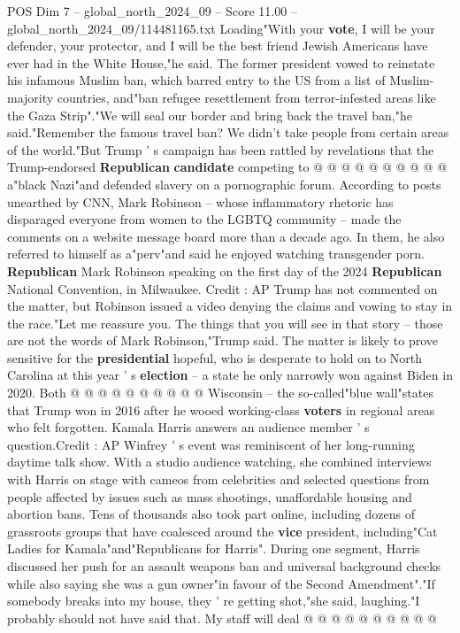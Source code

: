 \begin{textsample}{POS Dim 7 – global\_north\_2024\_09 – Score 11.00 – global\_north\_2024\_09/114481165.txt}
Loading"With your \textbf{vote}, I will be your defender, your protector, and I will be the best friend Jewish Americans have ever had in the White House,"he said.
The former president vowed to reinstate his infamous Muslim ban, which barred entry to the US from a list of Muslim-majority countries, and"ban refugee resettlement from terror-infested areas like the Gaza Strip"."We will seal our border and bring back the travel ban,"he said."Remember the famous travel ban?
We didn't take people from certain areas of the world."But Trump ' s campaign has been rattled by revelations that the Trump-endorsed \textbf{Republican} \textbf{candidate} competing to @ @ @ @ @ @ @ @ @ @ a"black Nazi"and defended slavery on a pornographic forum.
According to posts unearthed by CNN, Mark Robinson -- whose inflammatory rhetoric has disparaged everyone from women to the LGBTQ community -- made the comments on a website message board more than a decade ago.
In them, he also referred to himself as a"perv"and said he enjoyed watching transgender porn. \textbf{Republican} Mark Robinson speaking on the first day of the 2024 \textbf{Republican} National Convention, in Milwaukee.
Credit : AP Trump has not commented on the matter, but Robinson issued a video denying the claims and vowing to stay in the race."Let me reassure you.
The things that you will see in that story -- those are not the words of Mark Robinson,"Trump said.
The matter is likely to prove sensitive for the \textbf{presidential} hopeful, who is desperate to hold on to North Carolina at this year ' s \textbf{election} -- a state he only narrowly won against Biden in 2020.
Both @ @ @ @ @ @ @ @ @ @ Wisconsin -- the so-called"blue wall"states that Trump won in 2016 after he wooed working-class \textbf{voters} in regional areas who felt forgotten.
Kamala Harris answers an audience member ' s question.Credit : AP Winfrey ' s event was reminiscent of her long-running daytime talk show.
With a studio audience watching, she combined interviews with Harris on stage with cameos from celebrities and selected questions from people affected by issues such as mass shootings, unaffordable housing and abortion bans.
Tens of thousands also took part online, including dozens of grassroots groups that have coalesced around the \textbf{vice} president, including"Cat Ladies for Kamala"and"Republicans for Harris".
During one segment, Harris discussed her push for an assault weapons ban and universal background checks while also saying she was a gun owner"in favour of the Second Amendment"."If somebody breaks into my house, they ' re getting shot,"she said, laughing."I probably should not have said that.
My staff will deal @ @ @ @ @ @ @ @ @ @

\end{textsample}
